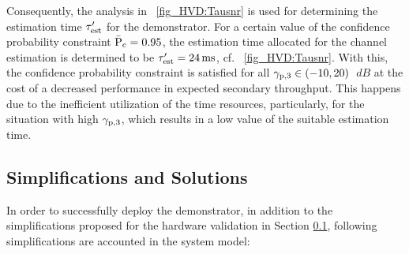 Consequently, the analysis in \figurename~\ref{fig_HVD:Tausnr} is used for determining the estimation time ${\tau}\sp{\prime}_{\text{est}}$ for the demonstrator. For a certain value of the confidence probability constraint $\bar{\text{P}}_{\text{c}} = 0.95$, the estimation time allocated for the channel estimation is determined to be ${\tau}\sp{\prime}_{\text{est}} = \SI{24}{ms}$, cf. \figurename~\ref{fig_HVD:Tausnr}. With this, the confidence probability constraint is satisfied for all ${\gamma}_{\text{p,3}} \in (-10,20)$ $\SI{}{dB}$ at the cost of a decreased performance in expected secondary throughput. This happens due to the inefficient utilization of the time resources, particularly, for the situation with high ${\gamma}_{\text{p,3}}$, which results in a low value of the suitable estimation time.


\subsection{Simplifications and Solutions} \label{ssec:simp2}
In order to successfully deploy the demonstrator, in addition to the simplifications proposed for the hardware validation in Section \ref{ssec:simp2}, following simplifications are accounted in the system model: 

